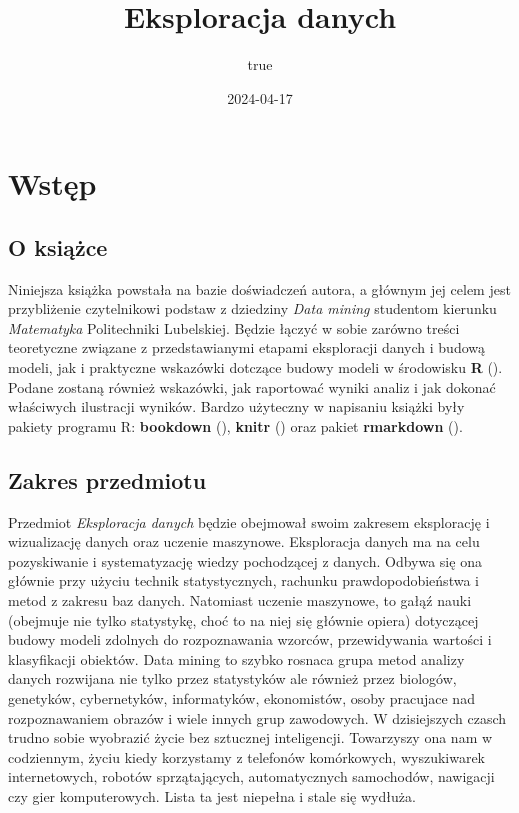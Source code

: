 \documentclass[
]{book}
\title{Eksploracja danych}
\author{true}
\date{2024-04-17}
\theoremstyle{plain}
\theoremstyle{definition}
\theoremstyle{definition}
\theoremstyle{definition}
\theoremstyle{definition}
\theoremstyle{definition}
\theoremstyle{remark}
\begin{document}
\maketitle

{
\setcounter{tocdepth}{1}
\tableofcontents
}
\chapter*{Wstęp}\label{wstux119p}

\section*{O książce}\label{o-ksiux105ux17cce}

Niniejsza książka powstała na bazie doświadczeń autora, a głównym jej celem jest przybliżenie czytelnikowi podstaw z dziedziny \emph{Data mining} studentom kierunku \emph{Matematyka} Politechniki Lubelskiej. Będzie łączyć w sobie zarówno treści teoretyczne związane z przedstawianymi etapami eksploracji danych i budową modeli, jak i praktyczne wskazówki dotczące budowy modeli w środowisku \textbf{R} (). Podane zostaną również wskazówki, jak raportować wyniki analiz i jak dokonać właściwych ilustracji wyników. Bardzo użyteczny w napisaniu książki były pakiety programu R: \textbf{bookdown} (), \textbf{knitr} () oraz pakiet \textbf{rmarkdown} ().

\section*{Zakres przedmiotu}\label{zakres-przedmiotu}

Przedmiot \emph{Eksploracja danych} będzie obejmował swoim zakresem eksplorację i wizualizację danych oraz uczenie maszynowe. Eksploracja danych ma na celu pozyskiwanie i systematyzację wiedzy pochodzącej z danych. Odbywa się ona głównie przy użyciu technik statystycznych, rachunku prawdopodobieństwa i metod z zakresu baz danych. Natomiast uczenie maszynowe, to gałąź nauki (obejmuje nie tylko statystykę, choć to na niej się głównie opiera) dotyczącej budowy modeli zdolnych do rozpoznawania wzorców, przewidywania wartości i klasyfikacji obiektów. Data mining to szybko rosnaca grupa metod analizy danych rozwijana nie tylko przez statystyków ale również przez biologów, genetyków, cybernetyków, informatyków, ekonomistów, osoby pracujace nad rozpoznawaniem obrazów i wiele innych grup zawodowych. W dzisiejszych czasch trudno sobie wyobrazić życie bez sztucznej inteligencji. Towarzyszy ona nam w codziennym, życiu kiedy korzystamy z telefonów komórkowych, wyszukiwarek internetowych, robotów sprzątających, automatycznych samochodów, nawigacji czy gier komputerowych. Lista ta jest niepełna i stale się wydłuża.
\end{document}
